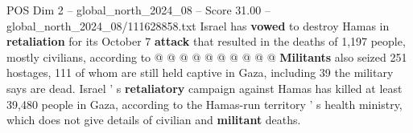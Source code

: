 \begin{textsample}{POS Dim 2 – global\_north\_2024\_08 – Score 31.00 – global\_north\_2024\_08/111628858.txt}
Israel has \textbf{vowed} to destroy Hamas in \textbf{retaliation} for its October 7 \textbf{attack} that resulted in the deaths of 1,197 people, mostly civilians, according to @ @ @ @ @ @ @ @ @ @ \textbf{Militants} also seized 251 hostages, 111 of whom are still held captive in Gaza, including 39 the military says are dead.
Israel ' s \textbf{retaliatory} campaign against Hamas has killed at least 39,480 people in Gaza, according to the Hamas-run territory ' s health ministry, which does not give details of civilian and \textbf{militant} deaths.

\end{textsample}
